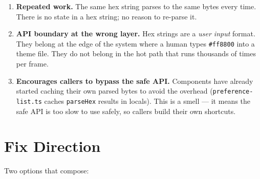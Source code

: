 \begin{enumerate}
\def\labelenumi{\arabic{enumi}.}
\tightlist
\item
  \textbf{Repeated work.} The same hex string parses to the same bytes every time. There is no state in a hex string; no reason to re-parse it.
\item
  \textbf{API boundary at the wrong layer.} Hex strings are a \emph{user input} format. They belong at the edge of the system where a human types \texttt{\#\allowbreak{}f\allowbreak{}f\allowbreak{}8\allowbreak{}8\allowbreak{}0\allowbreak{}0} into a theme file. They do not belong in the hot path that runs thousands of times per frame.
\item
  \textbf{Encourages callers to bypass the safe API.} Components have already started caching their own parsed bytes to avoid the overhead (\texttt{p\allowbreak{}r\allowbreak{}e\allowbreak{}f\allowbreak{}e\allowbreak{}r\allowbreak{}e\allowbreak{}n\allowbreak{}c\allowbreak{}e\allowbreak{}-\allowbreak{}l\allowbreak{}i\allowbreak{}s\allowbreak{}t\allowbreak{}.\allowbreak{}t\allowbreak{}s} caches \texttt{p\allowbreak{}a\allowbreak{}r\allowbreak{}s\allowbreak{}e\allowbreak{}H\allowbreak{}e\allowbreak{}x} results in locals). This is a smell --- it means the safe API is too slow to use safely, so callers build their own shortcuts.
\end{enumerate}

\section{Fix Direction}\label{record-367-fix-direction}

Two options that compose:


